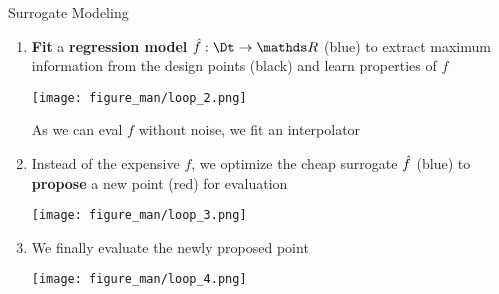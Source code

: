 \documentclass[11pt,compress,t,notes=noshow, xcolor=table]{beamer}
\begin{document}
\begin{vbframe}{Surrogate Modeling}
\begin{enumerate}
\item \textbf{Fit} a \textbf{regression model} $\fh: \Dt \rightarrow \R$ (blue) to extract maximum information from the design points (black) and learn properties of $f$
\vspace{+.05cm}

\begin{center}
  \texttt{[image: figure\_man/loop\_2.png]}
\end{center}

\vspace{-.1cm}
As we can eval $f$ without noise, we fit an interpolator

\framebreak 

\item Instead of the expensive $f$, we optimize the cheap 
 surrogate $\hat{f}$ (blue) to \textbf{propose} a new point (red) for evaluation 
\vspace{+.05cm}

\begin{center}
  \texttt{[image: figure\_man/loop\_3.png]}
\end{center}


\framebreak 

\item We finally evaluate the newly proposed point
\vspace{+.45cm}

\begin{center}
  \texttt{[image: figure\_man/loop\_4.png]}
\end{center}

\end{enumerate}

\end{vbframe}
\end{document}
